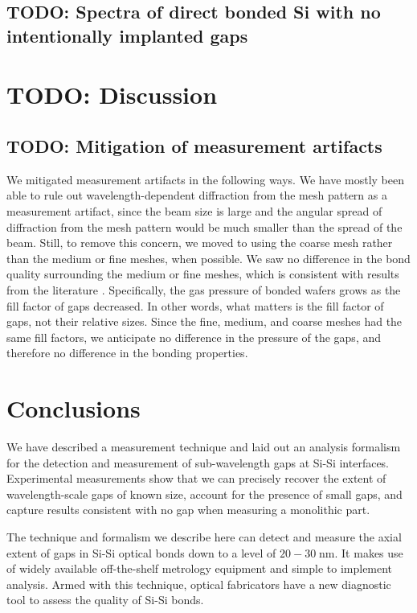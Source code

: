 \documentclass[osajnl,preprint,showpacs,superscriptaddress,12pt]{revtex4-1} %
\begin{document}
\subsection{TODO: Spectra of direct bonded Si with no intentionally implanted gaps}
\section{TODO: Discussion}

\subsection{TODO: Mitigation of measurement artifacts}
We mitigated measurement artifacts in the following ways.  We have mostly been able to rule out wavelength-dependent diffraction from the mesh pattern as a measurement artifact, since the beam size is large and the angular spread of diffraction from the mesh pattern would be much smaller than the spread of the beam.  Still, to remove this concern, we moved to using the coarse mesh rather than the medium or fine meshes, when possible.  We saw no difference in the bond quality surrounding the medium or fine meshes, which is consistent with results from the literature \cite{1992JEMat..21..669M}.  Specifically, the gas pressure of bonded wafers grows as the fill factor of gaps decreased.  In other words, what matters is the fill factor of gaps, not their relative sizes.  Since the fine, medium, and coarse meshes had the same fill factors, we anticipate no difference in the pressure of the gaps, and therefore no difference in the bonding properties.


\section{Conclusions}
We have described a measurement technique and laid out an analysis formalism for the detection and measurement of sub-wavelength gaps at Si-Si interfaces.  Experimental measurements show that we can precisely recover the extent of wavelength-scale gaps of known size, account for the presence of small gaps, and capture results consistent with no gap when measuring a monolithic part.

The technique and formalism we describe here can detect and measure the axial extent of gaps in Si-Si optical bonds down to a level of $20-30\;$nm.  It makes use of widely available off-the-shelf metrology equipment and simple to implement analysis.  Armed with this technique, optical fabricators have a new diagnostic tool to assess the quality of Si-Si bonds.
\end{document}
